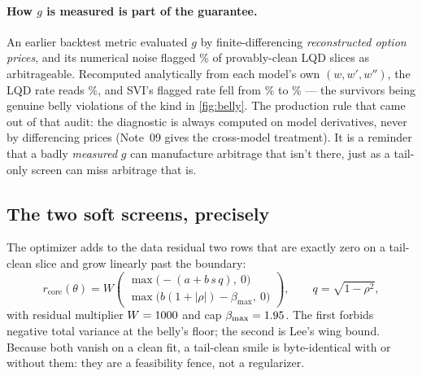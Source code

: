 \documentclass[11pt]{article}
\begin{document}
\paragraph{How $g$ is measured is part of the guarantee.}
An earlier backtest metric evaluated $g$ by finite-differencing
\emph{reconstructed option prices}, and its numerical noise flagged
\svimomlqdarbold\% of provably-clean LQD slices as arbitrageable.  Recomputed
analytically from each model's own $(w,w',w'')$, the LQD rate reads
\svimomlqdarbnew\%, and SVI's flagged rate fell from \svimomarbold\% to
\svimomarbnew\% --- the survivors being genuine belly violations of the kind in
\cref{fig:belly}.  The production rule that came out of that audit: the
diagnostic is always computed on model derivatives, never by differencing
prices (Note~09 gives the cross-model treatment).  It is a reminder that a
badly \emph{measured} $g$ can manufacture arbitrage that isn't there, just as a
tail-only screen can miss arbitrage that is.

\subsection{The two soft screens, precisely}
\label{sec:penalties}

The optimizer adds to the data residual two rows that are exactly zero on a
tail-clean slice and grow linearly past the boundary:
\begin{equation}
r_{\mathrm{core}}(\theta)=W\begin{pmatrix}
\max\!\big(-(a+b\,s\,q),\ 0\big)\\[2pt]
\max\!\big(b(1+|\rho|)-\beta_{\max},\ 0\big)
\end{pmatrix},\qquad q=\sqrt{1-\rho^2},
\label{eq:penalties}
\end{equation}
with residual multiplier $W=1000$ and cap $\beta_{\max}=1.95$.
The first forbids negative total variance at the belly's floor; the second is
Lee's wing bound.  Because both vanish on a clean fit, a tail-clean smile is
byte-identical with or without them: they are a feasibility fence, not a
regularizer.
\end{document}
